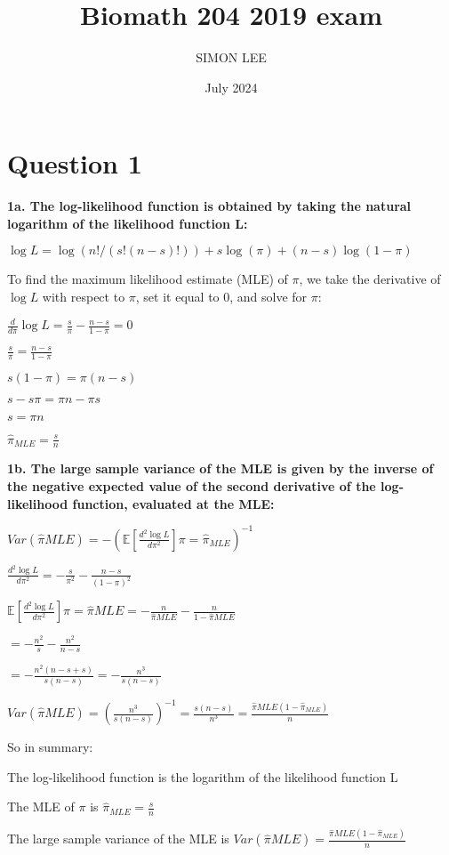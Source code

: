 \documentclass{article}
\title{Biomath 204 2019 exam}
\author{SIMON LEE}
\date{July 2024}
\begin{document}
\maketitle

\section{Question 1}

\textbf{1a. The log-likelihood function is obtained by taking the natural logarithm of the likelihood function L:}


$\log L = \log(n!/(s!(n-s)!)) + s \log(\pi) + (n-s) \log(1-\pi)$

To find the maximum likelihood estimate (MLE) of $\pi$, we take the derivative of $\log L$ with respect to $\pi$, set it equal to 0, and solve for $\pi$:

$\frac{d}{d\pi} \log L = \frac{s}{\pi} - \frac{n-s}{1-\pi} = 0$

$\frac{s}{\pi} = \frac{n-s}{1-\pi}$

$s(1-\pi) = \pi(n-s)$

$s - s\pi = \pi n - \pi s$

$s = \pi n$

$\hat{\pi}_{MLE} = \frac{s}{n}$

\textbf{1b. The large sample variance of the MLE is given by the inverse of the negative expected value of the second derivative of the log-likelihood function, evaluated at the MLE:}

$Var(\hat{\pi}{MLE}) = -\left(\mathbb{E}\left[\frac{d^2 \log L}{d\pi^2}\right]{\pi=\hat{\pi}_{MLE}}\right)^{-1}$

$\frac{d^2 \log L}{d\pi^2} = -\frac{s}{\pi^2} - \frac{n-s}{(1-\pi)^2}$

$\mathbb{E}\left[\frac{d^2 \log L}{d\pi^2}\right]{\pi=\hat{\pi}{MLE}} = -\frac{n}{\hat{\pi}{MLE}} - \frac{n}{1-\hat{\pi}{MLE}}$

$= -\frac{n^2}{s} - \frac{n^2}{n-s}$

$= -\frac{n^2(n-s+s)}{s(n-s)} = -\frac{n^3}{s(n-s)}$

$Var(\hat{\pi}{MLE}) = \left(\frac{n^3}{s(n-s)}\right)^{-1} = \frac{s(n-s)}{n^3} = \frac{\hat{\pi}{MLE}(1-\hat{\pi}_{MLE})}{n}$

So in summary:

The log-likelihood function is the logarithm of the likelihood function L

The MLE of $\pi$ is $\hat{\pi}_{MLE} = \frac{s}{n}$

The large sample variance of the MLE is $Var(\hat{\pi}{MLE}) = \frac{\hat{\pi}{MLE}(1-\hat{\pi}_{MLE})}{n}$
\end{document}
